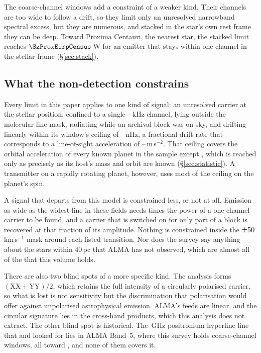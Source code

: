 The \NCoarse{} coarse-channel windows add a constraint of a weaker kind.
Their channels are too wide to follow a drift, so they limit only an
unresolved narrowband spectral excess, but they are numerous, and stacked in
the star's own rest frame they can be deep. Toward Proxima Centauri, the
nearest star, the stacked limit reaches $\SzProxEirpCensus$\,W for an
emitter that stays within one channel in the stellar frame
(\S\ref{sec:stack}).

\subsection{What the non-detection constrains}
\label{sec:excludes}

Every limit in this paper applies to one kind of signal: an unresolved
carrier at the stellar position, confined to a single
\ChanLoA--\ChanHiA\,kHz channel, lying outside the molecular-line mask,
radiating while an archival block was on sky, and drifting linearly within
its window's ceiling of \DriftCeilLo--\DriftCeilHi\,nHz, a fractional drift
rate that corresponds to a line-of-sight acceleration of
\AccelCeilMed--\AccelCeilMax\,m\,s$^{-2}$. That ceiling covers
the orbital acceleration of every known planet in the sample except
\AccelWorstName, which is reached only as precisely as its host's mass and
orbit are known (\S\ref{sec:statistic}). A transmitter on a rapidly rotating
planet, however, uses most of the ceiling on the planet's spin.

A signal that departs from this model is constrained less, or not at all.
Emission as wide as the widest line in these fields needs \ScNBroadRatio{}
times the power of a one-channel carrier to be found, and a carrier that is
switched on for only part of a block is recovered at that fraction of its
amplitude. Nothing is constrained inside the $\pm50$\,km\,s$^{-1}$
mask around each listed transition. Nor does the survey say anything about
the stars within 40\,pc that ALMA has not observed, which are almost all of
the \NGaiaCensus{} that this volume holds.

There are also two blind spots of a more specific kind. The analysis forms
$(\mathrm{XX}+\mathrm{YY})/2$, which retains the full intensity of a
circularly polarised carrier, so what is lost is not sensitivity but the
discrimination that polarisation would offer against unpolarised
astrophysical emission. ALMA's feeds are linear, and the circular signature
lies in the cross-hand products, which this analysis does not extract. The
other blind spot is historical. The \SbPriorFreqGHz\,GHz positronium
hyperfine line that \citet{Steffes1994} and \citet{Mauersberger1996} looked
for lies in ALMA Band~5, where this survey holds \LnBFiveWin{} coarse-channel
windows, all toward \LnBFiveStars, and none of them covers it.

